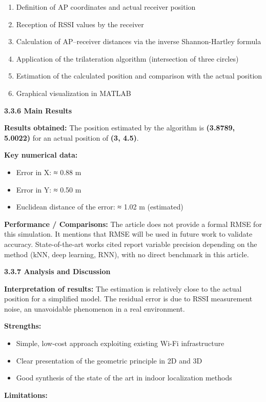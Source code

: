 \documentclass{ipgpmaster}
\begin{document}
\begin{enumerate}
    \item Definition of AP coordinates and actual receiver position
    \item Reception of RSSI values by the receiver
    \item Calculation of AP–receiver distances via the inverse Shannon-Hartley formula
    \item Application of the trilateration algorithm (intersection of three circles)
    \item Estimation of the calculated position and comparison with the actual position
    \item Graphical visualization in MATLAB


\end{enumerate}
 \textbf{3.3.6      Main Results}

\textbf{Results obtained:} The position estimated by the algorithm is \textbf{(3.8789, 5.0022)} for an actual position of \textbf{(3, 4.5)}.

\textbf{Key numerical data:}

\begin{itemize}
    \item Error in X: ≈ 0.88 m
    \item Error in Y: ≈ 0.50 m
    \item Euclidean distance of the error: ≈ 1.02 m (estimated)
\end{itemize}
\textbf{Performance / Comparisons:} The article does not provide a formal RMSE for this simulation. It mentions that RMSE will be used in future work to validate accuracy. State-of-the-art works cited report variable precision depending on the method (kNN, deep learning, RNN), with no direct benchmark in this article.


 \textbf{3.3.7      Analysis and Discussion}

\textbf{Interpretation of results:} The estimation is relatively close to the actual position for a simplified model. The residual error is due to RSSI measurement noise, an unavoidable phenomenon in a real environment.

\textbf{Strengths:}

\begin{itemize}
    \item Simple, low-cost approach exploiting existing Wi-Fi infrastructure
    \item Clear presentation of the geometric principle in 2D and 3D
    \item Good synthesis of the state of the art in indoor localization methods
\end{itemize}
\textbf{Limitations:}
\end{document}
